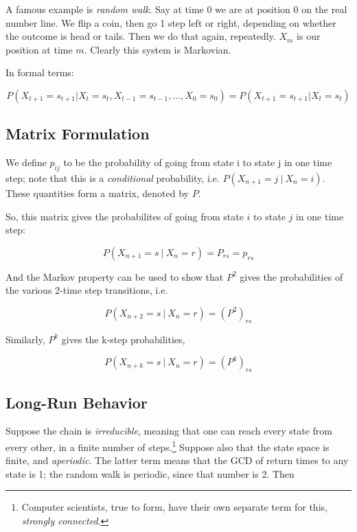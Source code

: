A famous example is \textit{random walk}.  Say at time 0 we are at
position 0 on the real number line.  We flip a coin, then go 1 step left
or right, depending on whether the outcome is head or tails.  Then we do
that again, repeatedly.  $X_m$ is our position at time $m$.  Clearly
this system is Markovian.

In formal terms:

\begin{equation}
\label{containshidden}
P(X_{t+1}=s_{t+1}|X_{t}=s_{t},X_{t-1}=s_{t-1},\ldots ,X_{0}=s_{0})=P(X_{t+1}=s_{t+1}|X_{t}=s_{t})
\end{equation}

\subsection{Matrix Formulation}

We define $p_{ij}$ to be the probability of going from state i to state
j in one time step; note that this is a {\it conditional} probability,
i.e. $P(X_{n+1} = j ~|~ X_n = i)$.  These quantities form a matrix,
denoted by $P$.

So, this matrix gives the probabilites of going from state $i$ to state
$j$ in one time step:

\begin{equation}
P(X_{n+1} = s ~|~ X_n = r) = P_{rs} = p_{rs}
\end{equation}

And the Markov property can be used to show that $P^2$ gives the
probabilities of the various 2-time step transitions, i.e.

\begin{equation}
P(X_{n+2} = s ~|~ X_n = r) = (P^2)_{rs}
\end{equation}

Similarly, $P^k$ gives the k-step probabilities,

\begin{equation}
\label{kstep}
P(X_{n+k} = s ~|~ X_n = r) = (P^k)_{rs}
\end{equation}

\subsection{Long-Run Behavior}

Suppose the chain is \textit{irreducible}, meaning that one can reach
every state from every other, in a finite number of
steps.\footnote{Computer scientists, true to form, have their own
separate term for this, \textit{strongly connected}.}  Suppose also that
the state space is finite, and \textit{aperiodic}.  The latter term
means that the GCD of return times to any state is 1; the random walk is
periodic, since that number is 2.  Then 

